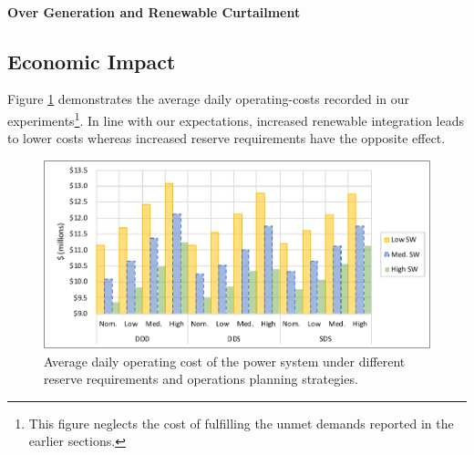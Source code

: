 \paragraph{Over Generation and Renewable Curtailment}

\subsection{Economic Impact} Figure \ref{sec:experiments:fig:avg_daily_cost} demonstrates the average daily operating-costs recorded in our experiments\footnote{This figure neglects the cost of fulfilling the unmet demands reported in the earlier sections.}. In line with our expectations, increased renewable integration leads to lower costs whereas increased reserve requirements have the opposite effect. 
\begin{figure}[h!]
\centering
\includegraphics[trim={5mm 2mm 2mm 2mm}, clip, scale=1]{./figures/avg_daily_cost.pdf}
\caption{Average daily operating cost of the power system under different reserve requirements and operations planning strategies.}
\label{sec:experiments:fig:avg_daily_cost}
\end{figure} 

